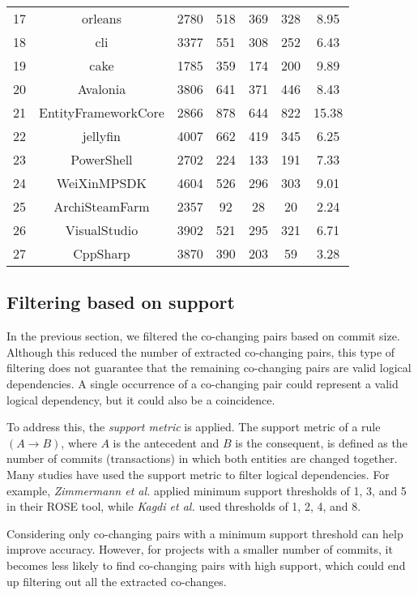\begin{table}[!h]
{\begin{tabular}{|c|c|c|c|c|c|c|}
17	&	orleans	&	2780	&	518	&	369	&	328	&	8.95	\\
18	&	cli	&	3377	&	551	&	308	&	252	&	6.43	\\
19	&	cake	&	1785	&	359	&	174	&	200	&	9.89	\\
20	&	Avalonia	&	3806	&	641	&	371	&	446	&	8.43	\\
21	&	EntityFrameworkCore	&	2866	&	878	&	644	&	822	&	15.38	\\
22	&	jellyfin	&	4007	&	662	&	419	&	345	&	6.25	\\
23	&	PowerShell	&	2702	&	224	&	133	&	191	&	7.33	\\
24	&	WeiXinMPSDK	&	4604	&	526	&	296	&	303	&	9.01	\\
25	&	ArchiSteamFarm	&	2357	&	92	&	28	&	20	&	2.24	\\
26	&	VisualStudio	&	3902	&	521	&	295	&	321	&	6.71	\\
27	&	CppSharp	&	3870	&	390	&	203	&	59	&	3.28	\\
\hline
\end{tabular}
}
\end{table}





\subsection{Filtering based on support}
\label{subsec:filtering_support}

\hspace{4em}In the previous section, we filtered the co-changing pairs based on commit size. Although this reduced the number of extracted co-changing pairs, this type of filtering does not guarantee that the remaining co-changing pairs are valid logical dependencies. A single occurrence of a co-changing pair could represent a valid logical dependency, but it could also be a coincidence.  

To address this, the \textit{support metric} is applied. The support metric of a rule $(A \rightarrow B)$, where $A$ is the antecedent and $B$ is the consequent, is defined as the number of commits (transactions) in which both entities are changed together. Many studies have used the support metric to filter logical dependencies. For example, \textit{Zimmermann et al.} \cite{Zimmermann:2004:MVH:998675.999460} applied minimum support thresholds of 1, 3, and 5 in their ROSE tool, while \textit{Kagdi et al.} \cite{article-Kagdi-commit} used thresholds of 1, 2, 4, and 8.

Considering only co-changing pairs with a minimum support threshold can help improve accuracy. However, for projects with a smaller number of commits, it becomes less likely to find co-changing pairs with high support, which could end up filtering out all the extracted co-changes.

